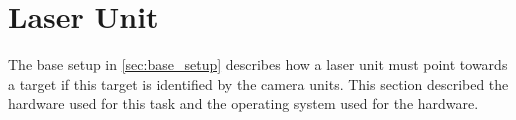 \section{Laser Unit}\label{sec:laser}
The base setup in \cref{sec:base_setup} describes how a laser unit must point towards a target if this target is identified by the camera units. This section described the hardware used for this task and the operating system used for the hardware. 

